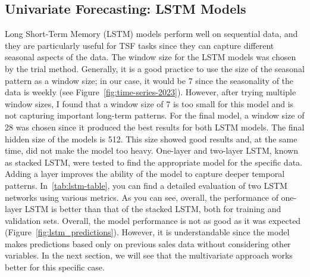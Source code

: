 \documentclass[conference]{IEEEtran}
\begin{document}
\subsection{Univariate Forecasting: LSTM Models}
Long Short-Term Memory (LSTM) models perform well on sequential data, and they are particularly useful for TSF tasks since they can capture different seasonal aspects of the data. The window size for the LSTM models was chosen by the trial method. Generally, it is a good practice to use the size of the seasonal pattern as a window size; in our case, it would be 7 since the seasonality of the data is weekly (see Figure~\ref{fig:time-series-2023}). However, after trying multiple window sizes, I found that a window size of 7 is too small for this model and is not capturing important long-term patterns. For the final model, a window size of 28 was chosen since it produced the best results for both LSTM models. The final hidden size of the models is 512. This size showed good results and, at the same time, did not make the model too heavy. One-layer and two-layer LSTM, known as stacked LSTM, were tested to find the appropriate model for the specific data. Adding a layer improves the ability of the model to capture deeper temporal patterns. In~\autoref{tab:lstm-table}, you can find a detailed evaluation of two LSTM networks using various metrics. As you can see, overall, the performance of one-layer LSTM is better than that of the stacked LSTM, both for training and validation sets. Overall, the model performance is not as good as it was expected (Figure~\ref{fig:lstm_predictions}). However, it is understandable since the model makes predictions based only on previous sales data without considering other variables. In the next section, we will see that the multivariate approach works better for this specific case.




\end{document}
